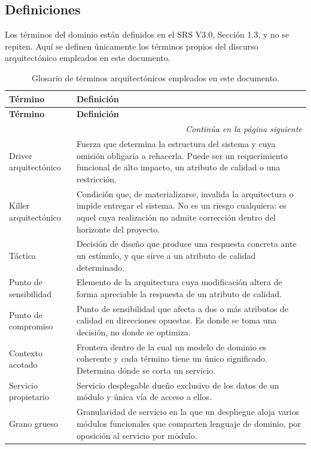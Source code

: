 \documentclass[11pt,a4paper]{article}
\newcommand{\contlinea}[1]{\multicolumn{#1}{r}{\footnotesize\itshape Continúa en la página siguiente}}
\begin{document}
\subsection{Definiciones}

Los términos del dominio están definidos en el SRS V3.0, Sección 1.3, y no se repiten. Aquí se definen únicamente los términos propios del discurso arquitectónico empleados en este documento.

\begin{longtable}{L{3.4cm} L{11.2cm}}
\caption{Glosario de términos arquitectónicos empleados en este documento.}\label{tab:glosarioarq}\\
\toprule
\textbf{Término} & \textbf{Definición} \\
\midrule
\endfirsthead
\toprule
\textbf{Término} & \textbf{Definición} \\
\midrule
\endhead
\midrule
\contlinea{2} \\
\endfoot
\bottomrule
\endlastfoot
Driver arquitectónico & Fuerza que determina la estructura del sistema y cuya omisión obligaría a rehacerla. Puede ser un requerimiento funcional de alto impacto, un atributo de calidad o una restricción. \\
Killer arquitectónico & Condición que, de materializarse, invalida la arquitectura o impide entregar el sistema. No es un riesgo cualquiera: es aquel cuya realización no admite corrección dentro del horizonte del proyecto. \\
Táctica & Decisión de diseño que produce una respuesta concreta ante un estímulo, y que sirve a un atributo de calidad determinado. \\
Punto de sensibilidad & Elemento de la arquitectura cuya modificación altera de forma apreciable la respuesta de un atributo de calidad. \\
Punto de compromiso & Punto de sensibilidad que afecta a dos o más atributos de calidad en direcciones opuestas. Es donde se toma una decisión, no donde se optimiza. \\
Contexto acotado & Frontera dentro de la cual un modelo de dominio es coherente y cada término tiene un único significado. Determina dónde se corta un servicio. \\
Servicio propietario & Servicio desplegable dueño exclusivo de los datos de un módulo y única vía de acceso a ellos. \\
Grano grueso & Granularidad de servicio en la que un despliegue aloja varios módulos funcionales que comparten lenguaje de dominio, por oposición al servicio por módulo. \\

\end{longtable}
\end{document}
